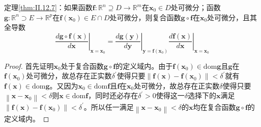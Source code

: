 \documentclass[main.tex]{subfiles}
\begin{document}
\begin{theorem*}
定理\ref{thm:II.12.7}：如果函数$\mathbf{f}:\mathbb{R}^n\supseteq D\rightarrow\mathbb{R}^m$在$\mathbf{x}_0\in D$处可微分；函数$\mathbf{g}:\mathbb{R}^n\supset E\rightarrow\mathbb{R}^p$在$\mathbf{f}\left(\mathbf{x}_0\right)\in E\cap D$处可微分，则复合函数$\mathbf{g}\circ\mathbf{f}$在$\mathbf{x}_0$处可微分，且其全导数
\[
\left.\frac{d\mathbf{g}\circ\mathbf{f}\left(\mathbf{x}\right)}{d\mathbf{x}}\right|_{\mathbf{x}=\mathbf{x}_0}=\left.\frac{d\mathbf{g}\left(\mathbf{y}\right)}{d\mathbf{y}}\right|_{\mathbf{y}=\mathbf{f}\left(\mathbf{x}_0\right)}\left.\frac{d\mathbf{f}\left(\mathbf{x}\right)}{d\mathbf{x}}\right|_{\mathbf{x}=\mathbf{x}_0}
\]
\end{theorem*}
\begin{proof}
首先证明$\mathbf{x}_0$处于复合函数$\mathbf{g}\circ\mathbf{f}$的定义域内。由于$\mathbf{f}\left(\mathbf{x}_0\right)\in\mathrm{dom}\mathbf{g}$且$\mathbf{g}$在$\mathbf{f}\left(\mathbf{x}_0\right)$处可微分，故总存在正实数$\delta^\prime$使得只要$\left\|\mathbf{f}\left(\mathbf{x}\right)-\mathbf{f}\left(\mathbf{x}_0\right)\right\|<\delta^\prime$就有$\mathbf{f}\left(\mathbf{x}\right)\in\mathrm{dom}\mathbf{g}$。又因为$\mathbf{x}_0\in\mathrm{dom}\mathbf{f}$且$\mathbf{f}$在$\mathbf{x}_0$处可微分，故总存在正实数$\delta$使得只要$\left\|\mathbf{x}-\mathbf{x}_0\right\|<\delta$则$\mathbf{x}\in\mathrm{dom}\mathbf{f}$，同时还必存在$\delta^\prime>0$使得这一$\delta$选择下的$\mathbf{x}$满足$\left\|\mathbf{f}\left(\mathbf{x}\right)-\mathbf{f}\left(\mathbf{x}_0\right)\right\|<\delta^\prime$。所以任一满足$\left\|\mathbf{x}-\mathbf{x}_0\right\|<\delta$的$\mathbf{x}$均在复合函数$\mathbf{g}\circ\mathbf{f}$的定义域内。


\end{proof}
\end{document}
